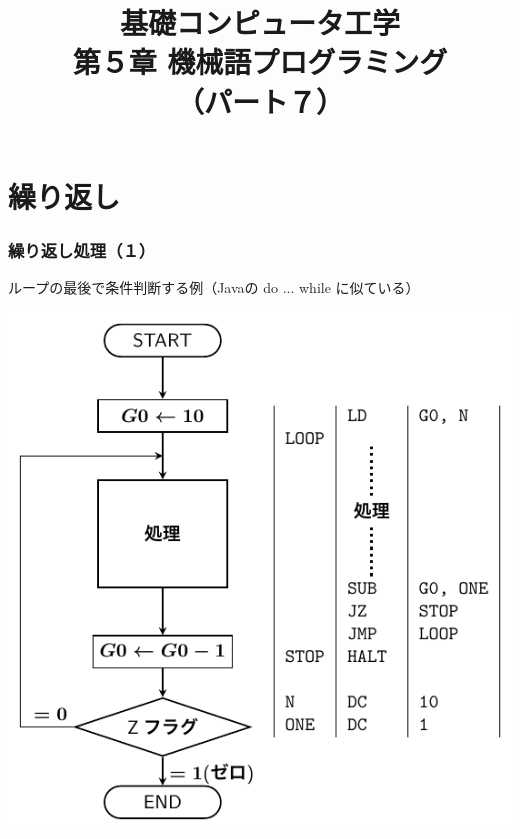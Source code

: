 \documentclass{beamer}                 %
\begin{document}
\title{基礎コンピュータ工学\\第５章 機械語プログラミング\\（パート７）}
\date{}

\begin{frame}
  \titlepage
\end{frame}


\section{繰り返し}
\begin{frame}
  \frametitle{繰り返し処理（１）}
  ループの最後で条件判断する例（Javaの do ... while に似ている）\\
  \vfill
  \centerline{\includegraphics[scale=0.7]{../Tikz/flow2.pdf}}
  \vfill
\end{frame}
\end{document}
